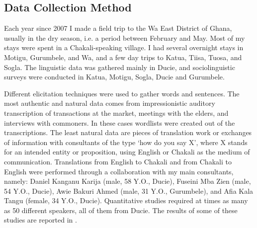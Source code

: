 \subsection{Data Collection Method}
\label{sec:lects}

Each year since 2007 I  made a field trip to the Wa East District of Ghana, 
usually in the dry season, i.e.  a  period between February and  May.  Most of 
my stays were spent in a Chakali-speaking village. I had several overnight stays 
in Motigu, Gurumbele,  and Wa, and a few day trips to Katua, Tiisa, Tuosa, and 
Sogla. The linguistic data was gathered mainly in Ducie, and sociolinguistic 
surveys were conducted in Katua, Motigu, Sogla, Ducie and Gurumbele.  




Different elicitation techniques were used to gather words and sentences.  The 
most authentic and
natural data comes from impressionistic auditory transcription of transactions 
at the market, meetings 
with the elders,  and interviews with commoners. In these cases wordlists were 
created out of the transcriptions. The least natural data are pieces of 
translation work  or exchanges of information with consultants of the type `how 
do you say X', where X stands for an intended entity or proposition, using 
English or Chakali as the medium of communication. Translations from English to 
Chakali and 
from Chakali to English  were performed through a  collaboration with 
 my main consultants, namely: 
Daniel Kanganu Karija (male, 58 Y.O., Ducie), Fuseini Mba Zien (male, 54 Y.O., 
Ducie), Awie Bakuri Ahmed (male, 31 Y.O., 
Gurumbele), and Afia Kala Tangu 
(female, 34 Y.O., Ducie). Quantitative studies required at times as many as 
50 different speakers, all of them from Ducie. The results of some of these 
studies are reported in  
\citet{Brin12, brin16}.

